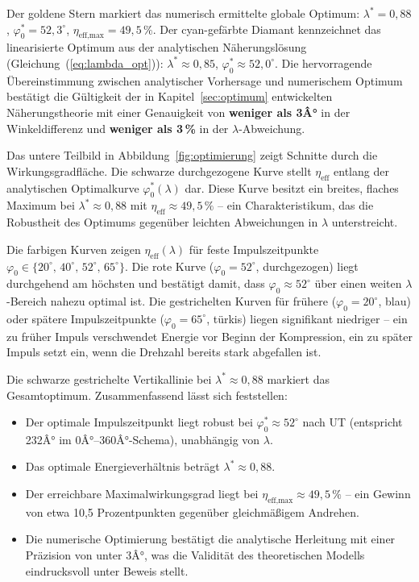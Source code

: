 ﻿\documentclass[a4paper,12pt]{article}
\begin{document}
Der goldene Stern markiert das numerisch ermittelte globale Optimum:
$\lambda^* = 0{,}88$, $\varphi_0^* = 52{,}3^\circ$, $\eta_\text{eff,max} = 49{,}5\,\%$.
Der cyan-gefärbte Diamant kennzeichnet das linearisierte Optimum aus der
analytischen Näherungslösung (Gleichung~(\ref{eq:lambda_opt})): $\lambda^* \approx 0{,}85$,
$\varphi_0^* \approx 52{,}0^\circ$. Die hervorragende Übereinstimmung zwischen
analytischer Vorhersage und numerischem Optimum bestätigt die Gültigkeit
der in Kapitel~\ref{sec:optimum} entwickelten Näherungstheorie mit einer
Genauigkeit von \textbf{weniger als 3Â°} in der Winkeldifferenz und
\textbf{weniger als 3\,\%} in der $\lambda$-Abweichung.

Das untere Teilbild in Abbildung~\ref{fig:optimierung} zeigt Schnitte durch
die Wirkungsgradfläche. Die schwarze durchgezogene Kurve stellt $\eta_\text{eff}$
entlang der analytischen Optimalkurve $\varphi_0^*(\lambda)$ dar. Diese Kurve
besitzt ein breites, flaches Maximum bei $\lambda^* \approx 0{,}88$ mit
$\eta_\text{eff} \approx 49{,}5\,\%$ -- ein Charakteristikum, das die Robustheit
des Optimums gegenüber leichten Abweichungen in $\lambda$ unterstreicht.

Die farbigen Kurven zeigen $\eta_\text{eff}(\lambda)$ für feste Impulszeitpunkte
$\varphi_0 \in \{20^\circ,\, 40^\circ,\, 52^\circ,\, 65^\circ\}$. Die rote
Kurve ($\varphi_0 = 52^\circ$, durchgezogen) liegt durchgehend am höchsten
und bestätigt damit, dass $\varphi_0 \approx 52^\circ$ über einen weiten
$\lambda$-Bereich nahezu optimal ist. Die gestrichelten Kurven für frühere
($\varphi_0 = 20^\circ$, blau) oder spätere Impulszeitpunkte ($\varphi_0 = 65^\circ$,
türkis) liegen signifikant niedriger -- ein zu früher Impuls verschwendet
Energie vor Beginn der Kompression, ein zu später Impuls setzt ein, wenn
die Drehzahl bereits stark abgefallen ist.

Die schwarze gestrichelte Vertikallinie bei $\lambda^* \approx 0{,}88$ markiert
das Gesamtoptimum. Zusammenfassend lässt sich feststellen:

\begin{itemize}
  \item Der optimale Impulszeitpunkt liegt robust bei $\varphi_0^* \approx 52^\circ$
    nach UT (entspricht 232Â° im 0Â°--360Â°-Schema), unabhängig von $\lambda$.
  \item Das optimale Energieverhältnis beträgt $\lambda^* \approx 0{,}88$.
  \item Der erreichbare Maximalwirkungsgrad liegt bei $\eta_\text{eff,max} \approx 49{,}5\,\%$ --
    ein Gewinn von etwa 10{,}5 Prozentpunkten gegenüber gleichmäßigem Andrehen.
  \item Die numerische Optimierung bestätigt die analytische Herleitung mit einer
    Präzision von unter 3Â°, was die Validität des theoretischen Modells eindrucksvoll
    unter Beweis stellt.
\end{itemize}
\end{document}
